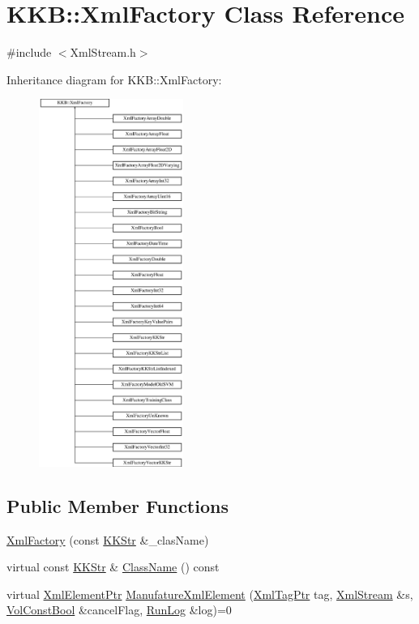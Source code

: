 \hypertarget{class_k_k_b_1_1_xml_factory}{}\section{K\+KB\+:\+:Xml\+Factory Class Reference}
\label{class_k_k_b_1_1_xml_factory}


{\ttfamily \#include $<$Xml\+Stream.\+h$>$}

Inheritance diagram for K\+KB\+:\+:Xml\+Factory\+:\begin{figure}[H]
\begin{center}
\leavevmode
\includegraphics[height=12.000000cm]{class_k_k_b_1_1_xml_factory}
\end{center}
\end{figure}
\subsection*{Public Member Functions}
\begin{DoxyCompactItemize}
\item 
\hyperlink{class_k_k_b_1_1_xml_factory_ab6312883139f5388a91856147852a9cf}{Xml\+Factory} (const \hyperlink{class_k_k_b_1_1_k_k_str}{K\+K\+Str} \&\+\_\+clas\+Name)
\item 
virtual const \hyperlink{class_k_k_b_1_1_k_k_str}{K\+K\+Str} \& \hyperlink{class_k_k_b_1_1_xml_factory_a32733484cc01e731d559a91cde0ad252}{Class\+Name} () const 
\item 
virtual \hyperlink{namespace_k_k_b_a60c0ababc47c146b900507f7a3d3872e}{Xml\+Element\+Ptr} \hyperlink{class_k_k_b_1_1_xml_factory_a3f4b4f19dee1905e1758b16c66d0112a}{Manufature\+Xml\+Element} (\hyperlink{namespace_k_k_b_a9253a3ea8a5da18ca82be4ca2b390ef0}{Xml\+Tag\+Ptr} tag, \hyperlink{class_k_k_b_1_1_xml_stream}{Xml\+Stream} \&s, \hyperlink{namespace_k_k_b_a7d390f568e2831fb76b86b56c87bf92f}{Vol\+Const\+Bool} \&cancel\+Flag, \hyperlink{class_k_k_b_1_1_run_log}{Run\+Log} \&log)=0
\end{DoxyCompactItemize}

